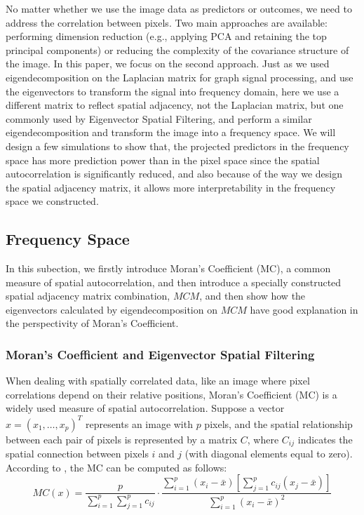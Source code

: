 \documentclass[12pt]{article}
\begin{document}
No matter whether we use the image data as predictors or outcomes, we need to address the correlation between pixels. Two main approaches are available: performing dimension reduction (e.g., applying PCA and retaining the top principal components) or reducing the complexity of the covariance structure of the image. In this paper, we focus on the second approach. Just as we used eigendecomposition on the Laplacian matrix for graph signal processing, and use the eigenvectors to transform the signal into frequency domain, here we use a different matrix to reflect spatial adjacency, not the Laplacian matrix, but one commonly used by Eigenvector Spatial Filtering, and perform a similar eigendecomposition and transform the image into a frequency space. We will design a few simulations to show that, the projected predictors in the frequency space has more prediction power than in the pixel space since the spatial autocorrelation is significantly reduced, and also because of the way we design the spatial adjacency matrix, it allows more interpretability in the frequency space we constructed.


\subsection{Frequency Space}

In this subection, we firstly introduce Moran's Coefficient (MC), a common measure of spatial autocorrelation, and then introduce a specially constructed spatial adjacency matrix combination, \( M C M \), and then show how the eigenvectors calculated by eigendecomposition on \( M C M \) have good explanation in the perspectivity of Moran's Coefficient.

\subsubsection{Moran's Coefficient and Eigenvector Spatial Filtering}

When dealing with spatially correlated data, like an image where pixel correlations depend on their relative positions, Moran’s Coefficient (MC) is a widely used measure of spatial autocorrelation. Suppose a vector \( x = (x_1, \ldots, x_p)^T \) represents an image with \( p \) pixels, and the spatial relationship between each pair of pixels is represented by a matrix \( C \), where \( C_{ij} \) indicates the spatial connection between pixels \( i \) and \( j \) (with diagonal elements equal to zero). According to \citet{griffith2014spatial}, the MC can be computed as follows:
\[
M C(x) = \frac{p}{\sum_{i=1}^p \sum_{j=1}^p c_{ij}} \cdot \frac{\sum_{i=1}^p \left(x_i - \bar{x} \right) \left[ \sum_{j=1}^p c_{ij} \left( x_j - \bar{x} \right) \right]}{\sum_{i=1}^p \left( x_i - \bar{x} \right)^2}
\]
\end{document}
